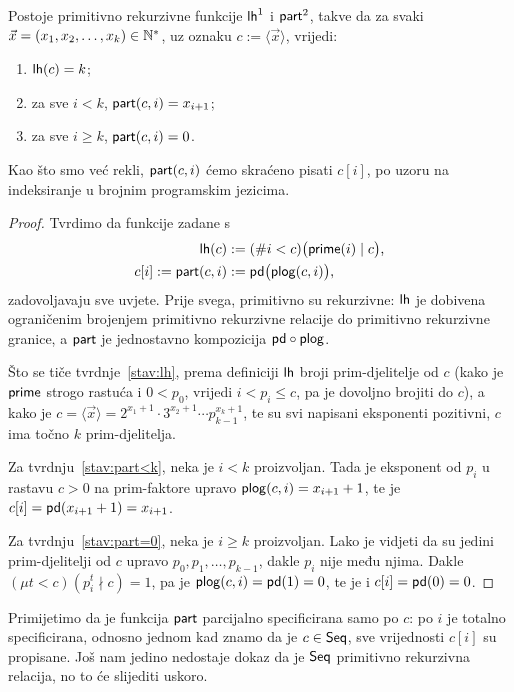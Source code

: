 \begin{propozicija}\label{prop:lhpartprn}
Postoje primitivno rekurzivne funkcije $\mathsf{lh}^1$ i $\mathsf{part}^2$, takve da za svaki $\vec x=(x_1,x_2,\dotsc,x_k)\in{\mathbb N}^*$, uz oznaku $c:=\langle\vec x\rangle$, vrijedi:
\begin{enumerate}
    \item\label{stav:lh} $\mathsf{lh}(c)=k$;
    \item\label{stav:part<k} za sve $i<k$, $\mathsf{part}(c,i)=x_{i+1}$;
    \item\label{stav:part=0} za sve $i\ge k$, $\mathsf{part}(c,i)=0$.
\end{enumerate}
\end{propozicija}
Kao što smo već rekli, $\mathsf{part}(c,i)$ ćemo skraćeno pisati $c[i]$, po uzoru na indeksiranje u brojnim programskim jezicima.
\begin{proof}
Tvrdimo da funkcije zadane s
\begin{align}
\mathsf{lh}(c)&:=(\#i<c)\bigl(\mathsf{prime}(i)\mid c\bigr)\text,\\
c[i]:=\mathsf{part}(c,i)&:=\mathsf{pd}\bigl(\mathsf{plog}(c,i)\bigr)\text,
\end{align}
zadovoljavaju sve uvjete. Prije svega, primitivno su rekurzivne: $\mathsf{lh}$ je dobivena og\-ra\-ni\-če\-nim brojenjem primitivno rekurzivne relacije do primitivno rekurzivne granice, a $\mathsf{part}$ je jednostavno kompozicija $\mathsf{pd}\circ\mathsf{plog}$.

Što se tiče tvrdnje~\ref{stav:lh}, prema definiciji $\mathsf{lh}$ broji prim-djelitelje od $c$ (kako je $\mathsf{prime}$ strogo rastuća i $0<p_0$, vrijedi $i<p_i\le c$, pa je dovoljno brojiti do $c$), a kako je $c=\langle\vec x\rangle=2^{x_1+1}\cdot3^{x_2+1}\dotsm p_{k-1}^{x_k+1}$, te su svi napisani eksponenti pozitivni, $c$ ima točno $k$ prim-djelitelja.

Za tvrdnju~\ref{stav:part<k}, neka je $i<k$ proizvoljan. Tada je eksponent od $p_i$ u rastavu $c>0$ na prim-faktore upravo $\mathsf{plog}(c,i)=x_{i+1}+1$, te je $c[i]=\mathsf{pd}(x_{i+1}+1)=x_{i+1}$.

Za tvrdnju~\ref{stav:part=0}, neka je $i\ge k$ proizvoljan. Lako je vidjeti da su jedini prim-djelitelji od $c$ upravo $p_0,p_1,\dotsc,p_{k-1}$, dakle $p_i$ nije među njima. Dakle $(\mu t<c)(p_i^t\nmid c)=1$, pa je $\mathsf{plog}(c,i)=\mathsf{pd}(1)=0$, te je i $c[i]=\mathsf{pd}(0)=0$.
\end{proof}

Primijetimo da je funkcija $\mathsf{part}$ parcijalno specificirana samo po $c$: po $i$ je totalno specificirana, odnosno jednom kad znamo da je $c\in\mathsf{Seq}$, sve vrijednosti $c[i]$ su propisane. Još nam jedino nedostaje dokaz da je $\mathsf{Seq}$ primitivno rekurzivna relacija, no to će slijediti uskoro.


